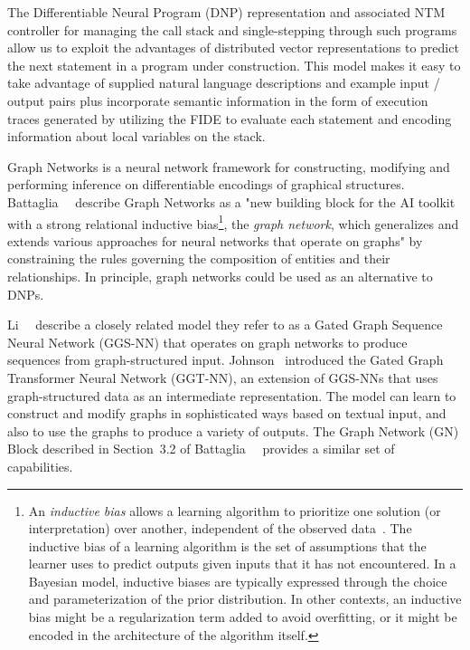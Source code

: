 
The Differentiable Neural Program (DNP) representation and associated NTM controller for managing the call stack and single-stepping through such programs allow us to exploit the advantages of distributed vector representations to predict the next statement in a program under construction. This model makes it easy to take advantage of supplied natural language descriptions and example input / output pairs plus incorporate semantic information in the form of execution traces generated by utilizing the FIDE to evaluate each statement and encoding information about local variables on the stack. 



Graph Networks is a neural network framework for constructing, modifying and performing inference on differentiable encodings of graphical structures. Battaglia~\etal{}~\cite{BattagliaetalCoRR-18} describe Graph Networks as a "new building block for the AI toolkit with a strong relational inductive bias\footnote{%
%
  An {\it{inductive bias}} allows a learning algorithm to prioritize one solution (or interpretation) over another, independent of the observed data~\cite{MitchellTR-80}. The inductive bias of a learning algorithm is the set of assumptions that the learner uses to predict outputs given inputs that it has not encountered. In a Bayesian model, inductive biases are typically expressed through the choice and parameterization of the prior distribution. In other contexts, an inductive bias might be a regularization term added to avoid overfitting, or it might be encoded in the architecture of the algorithm itself. {}},
%
the {\it{graph network}}, which generalizes and extends various approaches for neural networks that operate on graphs" by constraining the rules governing the composition of entities and their relationships. In principle, graph networks could be used as an alternative to DNPs.

Li~\etal{}~\cite{LietalICLR-18} describe a closely related model they refer to as a Gated Graph Sequence Neural Network (GGS-NN) that operates on graph networks to produce sequences from graph-structured input. Johnson~\cite{JohnsonICLR-17} introduced the Gated Graph Transformer Neural Network (GGT-NN), an extension of GGS-NNs that uses graph-structured data as an intermediate representation. The model can learn to construct and modify graphs in sophisticated ways based on textual input, and also to use the graphs to produce a variety of outputs. The Graph Network (GN) Block described in Section~3.2 of Battaglia~\etal{}~\cite{BattagliaetalCoRR-18} provides a similar set of capabilities.

